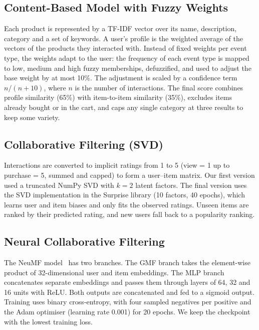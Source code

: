 \documentclass[conference]{IEEEtran}
\begin{document}
\subsection{Content-Based Model with Fuzzy Weights}
Each product is represented by a TF-IDF vector over its name, description, category and a set of keywords. A user's profile is the weighted average of the vectors of the products they interacted with. Instead of fixed weights per event type, the weights adapt to the user: the frequency of each event type is mapped to low, medium and high fuzzy memberships, defuzzified, and used to adjust the base weight by at most 10\%. The adjustment is scaled by a confidence term $n/(n+10)$, where $n$ is the number of interactions. The final score combines profile similarity (65\%) with item-to-item similarity (35\%), excludes items already bought or in the cart, and caps any single category at three results to keep some variety.

\subsection{Collaborative Filtering (SVD)}
Interactions are converted to implicit ratings from 1 to 5 (view = 1 up to purchase = 5, summed and capped) to form a user--item matrix. Our first version used a truncated NumPy SVD with $k = 2$ latent factors. The final version uses the SVD implementation in the Surprise library (10 factors, 40 epochs), which learns user and item biases and only fits the observed ratings. Unseen items are ranked by their predicted rating, and new users fall back to a popularity ranking.

\subsection{Neural Collaborative Filtering}
The NeuMF model~\cite{he2017} has two branches. The GMF branch takes the element-wise product of 32-dimensional user and item embeddings. The MLP branch concatenates separate embeddings and passes them through layers of 64, 32 and 16 units with ReLU. Both outputs are concatenated and fed to a sigmoid output. Training uses binary cross-entropy, with four sampled negatives per positive and the Adam optimiser (learning rate 0.001) for 20 epochs. We keep the checkpoint with the lowest training loss.
\end{document}

